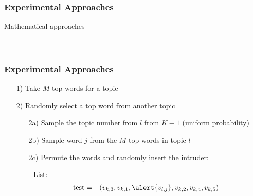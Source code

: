 \documentclass{beamer}
\numberwithin{equation}{section}
\begin{document}
\begin{frame}




\end{frame}



\begin{frame}
\frametitle{Experimental Approaches}

Mathematical approaches\pause {} \pause \\
 \pause \\
 \pause \\

 \pause 

\begin{itemize}
 \pause
{} 
\end{itemize}


\end{frame}

\begin{frame}
\frametitle{Experimental Approaches}


\begin{itemize}
\item[1)] Take $M$ top words for a topic
\item[2)] Randomly select a top word from another topic
\begin{itemize}
\item[2a)] Sample the topic number from $l$ from $K-1$ (uniform probability)
\item[2b)] Sample word $j$ from the $M$ top words in topic $l$
\item[2c)] Permute the words and randomly insert the \alert{intruder}:
\item[-] List: 
\begin{eqnarray}
\text{test} &  =  & (v_{k, 3}, v_{k, 1}, \alert{v_{l, j}}, v_{k, 2}, v_{k, 4}, v_{k,5}) \nonumber 
\end{eqnarray}
\end{itemize}
\end{itemize}




\end{frame}
\end{document}
